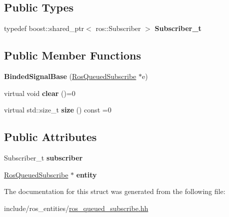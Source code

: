 \subsection*{Public Types}
\begin{DoxyCompactItemize}
\item 
\mbox{\label{structdynamic__graph_1_1internal_1_1BindedSignalBase_a1933d9d9542b368db7cc0bfb9f815aca}} 
typedef boost\+::shared\+\_\+ptr$<$ ros\+::\+Subscriber $>$ {\bfseries Subscriber\+\_\+t}
\end{DoxyCompactItemize}
\subsection*{Public Member Functions}
\begin{DoxyCompactItemize}
\item 
\mbox{\label{structdynamic__graph_1_1internal_1_1BindedSignalBase_a26dec102614700c0ee2e7ad82dade3fe}} 
{\bfseries Binded\+Signal\+Base} (\hyperlink{classdynamic__graph_1_1RosQueuedSubscribe}{Ros\+Queued\+Subscribe} $\ast$e)
\item 
\mbox{\label{structdynamic__graph_1_1internal_1_1BindedSignalBase_a65e4a7c402753871fb2b6ca25a4f7b04}} 
virtual void {\bfseries clear} ()=0
\item 
\mbox{\label{structdynamic__graph_1_1internal_1_1BindedSignalBase_acd1d899c6da6c8837f1df5c257d13169}} 
virtual std\+::size\+\_\+t {\bfseries size} () const =0
\end{DoxyCompactItemize}
\subsection*{Public Attributes}
\begin{DoxyCompactItemize}
\item 
\mbox{\label{structdynamic__graph_1_1internal_1_1BindedSignalBase_ad02d78850a029fc9296536a85c414ccb}} 
Subscriber\+\_\+t {\bfseries subscriber}
\item 
\mbox{\label{structdynamic__graph_1_1internal_1_1BindedSignalBase_ad755497fd34b1e59650bc290150ff931}} 
\hyperlink{classdynamic__graph_1_1RosQueuedSubscribe}{Ros\+Queued\+Subscribe} $\ast$ {\bfseries entity}
\end{DoxyCompactItemize}


The documentation for this struct was generated from the following file\+:\begin{DoxyCompactItemize}
\item 
include/ros\+\_\+entities/\hyperlink{ros__queued__subscribe_8hh}{ros\+\_\+queued\+\_\+subscribe.\+hh}\end{DoxyCompactItemize}

